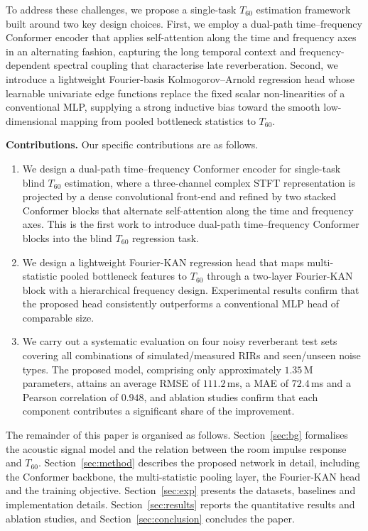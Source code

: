 \documentclass[a4paper,fleqn]{cas-dc}
\begin{document}
To address these challenges, we propose a single-task $T_{60}$ estimation
framework built around two key design choices. First, we employ a
dual-path time--frequency Conformer encoder that applies self-attention
along the time and frequency axes in an alternating fashion, capturing
the long temporal context and frequency-dependent spectral coupling that
characterise late reverberation. Second, we introduce a lightweight
Fourier-basis Kolmogorov--Arnold regression head whose learnable
univariate edge functions replace the fixed scalar non-linearities of a
conventional MLP, supplying a strong inductive bias toward the smooth
low-dimensional mapping from pooled bottleneck statistics to $T_{60}$.

\noindent\textbf{Contributions.} Our specific contributions are as
follows.

\begin{enumerate}[(1)]
  \item We design a dual-path time--frequency Conformer encoder for
        single-task blind $T_{60}$ estimation, where a three-channel
        complex STFT representation is projected by a dense convolutional
        front-end and refined by two stacked Conformer blocks that
        alternate self-attention along the time and frequency axes.
        This is the first work to introduce dual-path time--frequency
        Conformer blocks into the blind $T_{60}$ regression task.
  \item We design a lightweight Fourier-KAN regression head that maps
        multi-statistic pooled bottleneck features to $T_{60}$ through
        a two-layer Fourier-KAN block with a hierarchical frequency
        design. Experimental results confirm that the proposed head
        consistently outperforms a conventional MLP head of comparable
        size.
  \item We carry out a systematic evaluation on four noisy reverberant
        test sets covering all combinations of simulated/measured RIRs
        and seen/unseen noise types. The proposed model, comprising
        only approximately $1.35$\,M parameters, attains an average
        RMSE of $111.2$\,ms, a MAE of $72.4$\,ms and a Pearson
        correlation of $0.948$, and ablation studies confirm that each
        component contributes a significant share of the improvement.
\end{enumerate}

The remainder of this paper is organised as follows. Section~\ref{sec:bg}
formalises the acoustic signal model and the relation between the room
impulse response and $T_{60}$. Section~\ref{sec:method}
describes the proposed network in detail, including the Conformer
backbone, the multi-statistic pooling layer, the Fourier-KAN head and
the training objective. Section~\ref{sec:exp} presents the datasets, baselines and
implementation details. Section~\ref{sec:results} reports the
quantitative results and ablation studies, and Section~\ref{sec:conclusion}
concludes the paper.
\end{document}
